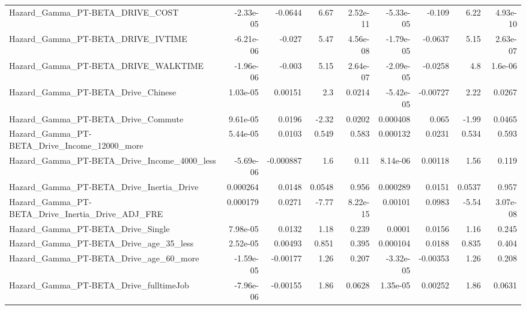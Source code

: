 \begin{tabular}{lrrrrrrrr}
Hazard\_Gamma\_PT-BETA\_DRIVE\_COST                    &   -2.33e-05 &      -0.0644 &     6.67 & 2.52e-11 &  -5.33e-05 &      -0.109 &         6.22 &      4.93e-10 \\
Hazard\_Gamma\_PT-BETA\_DRIVE\_IVTIME                  &   -6.21e-06 &       -0.027 &     5.47 & 4.56e-08 &  -1.79e-05 &     -0.0637 &         5.15 &      2.63e-07 \\
Hazard\_Gamma\_PT-BETA\_DRIVE\_WALKTIME                &   -1.96e-06 &       -0.003 &     5.15 & 2.64e-07 &  -2.09e-05 &     -0.0258 &          4.8 &       1.6e-06 \\
Hazard\_Gamma\_PT-BETA\_Drive\_Chinese                 &    1.03e-05 &      0.00151 &      2.3 &   0.0214 &  -5.42e-05 &    -0.00727 &         2.22 &        0.0267 \\
Hazard\_Gamma\_PT-BETA\_Drive\_Commute                 &    9.61e-05 &       0.0196 &    -2.32 &   0.0202 &   0.000408 &       0.065 &        -1.99 &        0.0465 \\
Hazard\_Gamma\_PT-BETA\_Drive\_Income\_12000\_more       &    5.44e-05 &       0.0103 &    0.549 &    0.583 &   0.000132 &      0.0231 &        0.534 &         0.593 \\
Hazard\_Gamma\_PT-BETA\_Drive\_Income\_4000\_less        &   -5.69e-06 &    -0.000887 &      1.6 &     0.11 &   8.14e-06 &     0.00118 &         1.56 &         0.119 \\
Hazard\_Gamma\_PT-BETA\_Drive\_Inertia\_Drive           &    0.000264 &       0.0148 &   0.0548 &    0.956 &   0.000289 &      0.0151 &       0.0537 &         0.957 \\
Hazard\_Gamma\_PT-BETA\_Drive\_Inertia\_Drive\_ADJ\_FRE   &    0.000179 &       0.0271 &    -7.77 & 8.22e-15 &    0.00101 &      0.0983 &        -5.54 &      3.07e-08 \\
Hazard\_Gamma\_PT-BETA\_Drive\_Single                  &    7.98e-05 &       0.0132 &     1.18 &    0.239 &     0.0001 &      0.0156 &         1.16 &         0.245 \\
Hazard\_Gamma\_PT-BETA\_Drive\_age\_35\_less             &    2.52e-05 &      0.00493 &    0.851 &    0.395 &   0.000104 &      0.0188 &        0.835 &         0.404 \\
Hazard\_Gamma\_PT-BETA\_Drive\_age\_60\_more             &   -1.59e-05 &     -0.00177 &     1.26 &    0.207 &  -3.32e-05 &    -0.00353 &         1.26 &         0.208 \\
Hazard\_Gamma\_PT-BETA\_Drive\_fulltimeJob             &   -7.96e-06 &     -0.00155 &     1.86 &   0.0628 &   1.35e-05 &     0.00252 &         1.86 &        0.0631 \\

\end{tabular}
